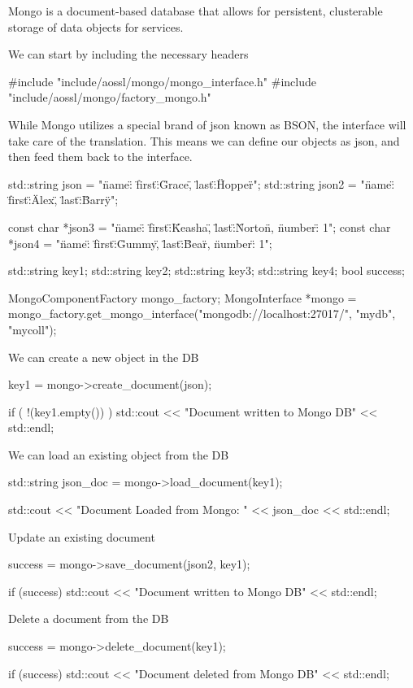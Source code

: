 Mongo is a document-\/based database that allows for persistent, clusterable storage of data objects for services.

We can start by including the necessary headers \begin{DoxyVerb}#include "include/aossl/mongo/mongo_interface.h"
#include "include/aossl/mongo/factory_mongo.h"
\end{DoxyVerb}


While Mongo utilizes a special brand of json known as \textquotesingle{}B\+S\+ON\textquotesingle{}, the interface will take care of the translation. This means we can define our objects as json, and then feed them back to the interface. \begin{DoxyVerb}std::string json = "{\"name\": {\"first\":\"Grace\", \"last\":\"Hopper\"}}";
std::string json2 = "{\"name\": {\"first\":\"Alex\", \"last\":\"Barry\"}}";

const char *json3 = "{\"name\": {\"first\":\"Keasha\", \"last\":\"Norton\"}, \"number\": 1}";
const char *json4 = "{\"name\": {\"first\":\"Gummy\", \"last\":\"Bear\"}, \"number\": 1}";

std::string key1;
std::string key2;
std::string key3;
std::string key4;
bool success;

MongoComponentFactory mongo_factory;
MongoInterface *mongo = mongo_factory.get_mongo_interface("mongodb://localhost:27017/", "mydb", "mycoll");
\end{DoxyVerb}


We can create a new object in the DB \begin{DoxyVerb}key1 = mongo->create_document(json);

if ( !(key1.empty()) ) {
  std::cout << "Document written to Mongo DB" << std::endl;
}
\end{DoxyVerb}


We can load an existing object from the DB \begin{DoxyVerb}std::string json_doc = mongo->load_document(key1);

std::cout << "Document Loaded from Mongo: " << json_doc << std::endl;
\end{DoxyVerb}


Update an existing document \begin{DoxyVerb}success = mongo->save_document(json2, key1);

if (success) {
  std::cout << "Document written to Mongo DB" << std::endl;
}
\end{DoxyVerb}


Delete a document from the DB \begin{DoxyVerb}success = mongo->delete_document(key1);

if (success) {
  std::cout << "Document deleted from Mongo DB" << std::endl;
}
\end{DoxyVerb}


